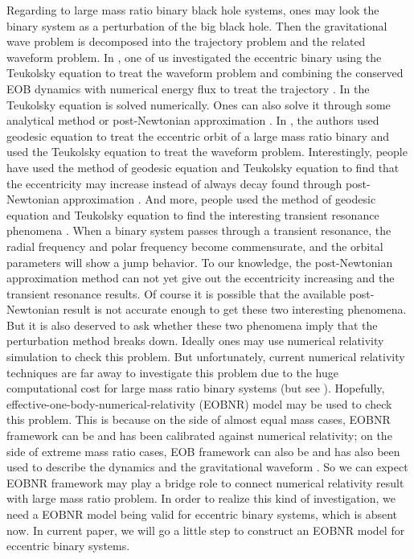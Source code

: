 \documentclass[prd,aps,a4paper,superscriptaddress,twocolumn,footinbib,showpacs]{revtex4}
\begin{document}
Regarding to large mass ratio binary black hole systems, ones may look the binary system as a perturbation of the big black hole. Then the gravitational wave problem is decomposed into the trajectory problem and the related waveform problem. In \cite{han2014gravitational}, one of us investigated the eccentric binary using the Teukolsky equation to treat the waveform problem and combining the conserved EOB dynamics with numerical energy flux to treat the trajectory \cite{han2011constructing}. In \cite{han2011constructing,han2014gravitational} the Teukolsky equation is solved numerically. Ones can also solve it through some analytical method \cite{sasaki2003analytic} or post-Newtonian approximation \cite{PhysRevD.93.064058}. In \cite{PhysRevD.73.024027}, the authors used geodesic equation to treat the eccentric orbit of a large mass ratio binary and used the Teukolsky equation to treat the waveform problem. Interestingly, people have used the method of geodesic equation and Teukolsky equation to find that the eccentricity may increase \cite{PhysRevD.47.5376,PhysRevD.58.064012} instead of always decay found through post-Newtonian approximation \cite{PhysRev.136.B1224}. And more, people used the method of geodesic equation and Teukolsky equation to find the interesting transient resonance phenomena \cite{PhysRevLett.109.071102,PhysRevD.94.124042}. When a binary system passes through a transient resonance, the radial frequency and polar frequency become commensurate, and the orbital parameters will show a jump behavior. To our knowledge, the post-Newtonian approximation method can not yet give out the eccentricity increasing and the transient resonance results. Of course it is possible that the available post-Newtonian result is not accurate enough to get these two interesting phenomena. But it is also deserved to ask whether these two phenomena imply that the perturbation method breaks down. Ideally ones may use numerical relativity simulation to check this problem. But unfortunately, current numerical relativity techniques are far away to investigate this problem due to the huge computational cost for large mass ratio binary systems \cite{PhysRevLett.106.041101} (but see \cite{lewis2016fundamental}). Hopefully, effective-one-body-numerical-relativity (EOBNR) model may be used to check this problem. This is because on the side of almost equal mass cases, EOBNR framework can be and has been calibrated against numerical relativity; on the side of extreme mass ratio cases, EOB framework can also be and has also been used to describe the dynamics and the gravitational waveform \cite{PhysRevLett.104.091102}. So we can expect EOBNR framework may play a bridge role to connect numerical relativity result with large mass ratio problem. In order to realize this kind of investigation, we need a EOBNR model being valid for eccentric binary systems, which is absent now. In current paper, we will go a little step to construct an EOBNR model for eccentric binary systems.
\end{document}
